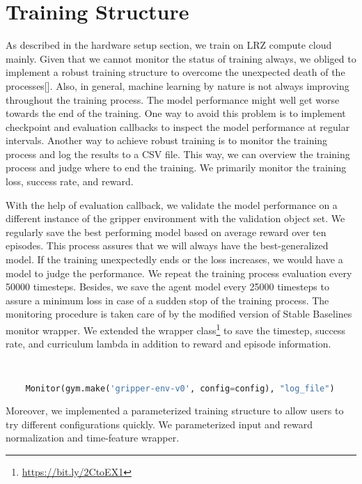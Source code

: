 \section{Training Structure}

As described in the hardware setup section, we train on LRZ compute cloud mainly. Given that we cannot monitor the status of training always, we obliged to implement a robust training structure to overcome the unexpected death of the processes[]. Also, in general, machine learning by nature is not always improving throughout the training process. The model performance might well get worse towards the end of the training. One way to avoid this problem is to implement checkpoint and evaluation callbacks to inspect the model performance at regular intervals. Another way to achieve robust training is to monitor the training process and log the results to a CSV file. This way, we can overview the training process and judge where to end the training. We primarily monitor the training loss, success rate, and reward.

With the help of evaluation callback, we validate the model performance on a different instance of the gripper environment with the validation object set. We regularly save the best performing model based on average reward over ten episodes. This process assures that we will always have the best-generalized model. If the training unexpectedly ends or the loss increases, we would have a model to judge the performance. We repeat the training process evaluation every 50000 timesteps. Besides, we save the agent model every 25000 timesteps to assure a minimum loss in case of a sudden stop of the training process.
The monitoring procedure is taken care of by the modified version of Stable Baselines monitor wrapper.  We extended the wrapper class\footnote{\url{https://bit.ly/2CtoEX1}} to save the timestep, success rate, and curriculum lambda in addition to reward and episode information.


\begin{lstlisting}[language=Python, caption= Integration of monitor wrapper helper function, label=code:monitor]


    Monitor(gym.make('gripper-env-v0', config=config), "log_file")


\end{lstlisting}

Moreover, we implemented a parameterized training structure to allow users to try different configurations quickly. We parameterized input and reward normalization and time-feature wrapper.
